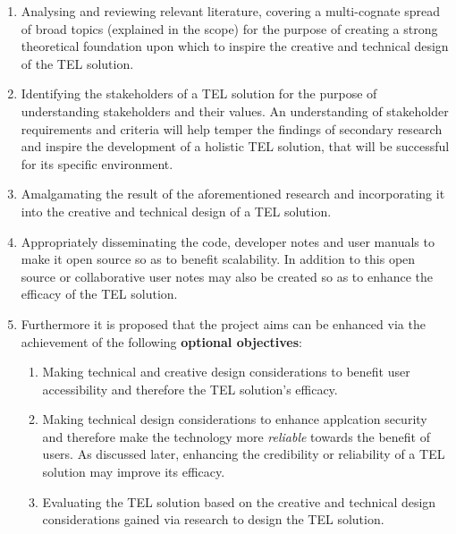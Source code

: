 \begin{enumerate}

    \item Analysing and reviewing relevant literature, covering a multi-cognate spread of broad topics (explained in the scope) for the purpose of creating a strong theoretical foundation upon which to inspire the creative and technical design of the TEL solution. 
    
    \item Identifying the stakeholders of a TEL solution for the purpose of understanding stakeholders and their values. An understanding of stakeholder requirements and criteria will help temper the findings of secondary research and inspire the development of a holistic TEL solution, that will be successful for its specific environment.
        
    \item Amalgamating the result of the aforementioned research and incorporating it into the creative and technical design of a TEL solution.
    
    \item Appropriately disseminating the code, developer notes and user manuals to make it open source so as to benefit scalability. In addition to this open source or collaborative user notes may also be created so as to enhance the efficacy of the TEL solution.
    
    \item Furthermore it is proposed that the project aims can be enhanced via the achievement of the following \textbf{optional objectives}:
    \begin{enumerate}
    \item Making technical and creative design considerations to benefit user accessibility and therefore the TEL solution's efficacy.
    \item Making technical design considerations to enhance applcation security and therefore make the technology more \textit{reliable} towards the benefit of users. As discussed later, enhancing the credibility or reliability of a TEL solution may improve its efficacy.
    \item Evaluating the TEL solution based on the creative and technical design considerations gained via research to design the TEL solution.
    \end{enumerate}
\end{enumerate}







